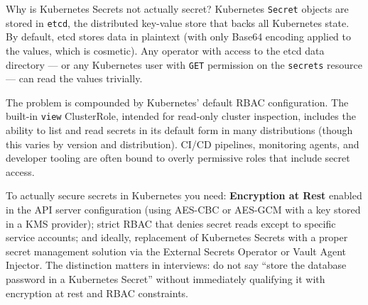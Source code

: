 \documentclass[11pt,a4paper]{article}
\begin{document}
\begin{curiobox}{Why is Kubernetes Secrets not actually secret?}
Kubernetes \texttt{Secret} objects are stored in \texttt{etcd}, the distributed key-value store that backs all Kubernetes state. By default, etcd stores data in plaintext (with only Base64 encoding applied to the values, which is cosmetic). Any operator with access to the etcd data directory --- or any Kubernetes user with \texttt{GET} permission on the \texttt{secrets} resource --- can read the values trivially.

The problem is compounded by Kubernetes' default RBAC configuration. The built-in \texttt{view} ClusterRole, intended for read-only cluster inspection, includes the ability to list and read secrets in its default form in many distributions (though this varies by version and distribution). CI/CD pipelines, monitoring agents, and developer tooling are often bound to overly permissive roles that include secret access.

To actually secure secrets in Kubernetes you need: \textbf{Encryption at Rest} enabled in the API server configuration (using AES-CBC or AES-GCM with a key stored in a KMS provider); strict RBAC that denies secret reads except to specific service accounts; and ideally, replacement of Kubernetes Secrets with a proper secret management solution via the External Secrets Operator or Vault Agent Injector. The distinction matters in interviews: do not say ``store the database password in a Kubernetes Secret'' without immediately qualifying it with encryption at rest and RBAC constraints.
\end{curiobox}
\end{document}
